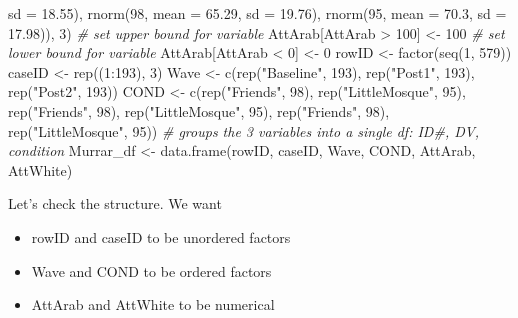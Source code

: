 \documentclass[
  11pt,
]{book}
\newenvironment{Shaded}{\begin{snugshade}}{\end{snugshade}}
\newcommand{\AttributeTok}[1]{\textcolor[rgb]{0.77,0.63,0.00}{#1}}
\newcommand{\CommentTok}[1]{\textcolor[rgb]{0.56,0.35,0.01}{\textit{#1}}}
\newcommand{\DecValTok}[1]{\textcolor[rgb]{0.00,0.00,0.81}{#1}}
\newcommand{\FloatTok}[1]{\textcolor[rgb]{0.00,0.00,0.81}{#1}}
\newcommand{\FunctionTok}[1]{\textcolor[rgb]{0.00,0.00,0.00}{#1}}
\newcommand{\NormalTok}[1]{#1}
\newcommand{\OtherTok}[1]{\textcolor[rgb]{0.56,0.35,0.01}{#1}}
\newcommand{\SpecialCharTok}[1]{\textcolor[rgb]{0.00,0.00,0.00}{#1}}
\newcommand{\StringTok}[1]{\textcolor[rgb]{0.31,0.60,0.02}{#1}}
\providecommand{\tightlist}{%
  \setlength{\itemsep}{0pt}\setlength{\parskip}{0pt}}
\begin{document}
\begin{Shaded}
\begin{Highlighting}[]
    \AttributeTok{sd =} \FloatTok{18.55}\NormalTok{), }\FunctionTok{rnorm}\NormalTok{(}\DecValTok{98}\NormalTok{, }\AttributeTok{mean =} \FloatTok{65.29}\NormalTok{, }\AttributeTok{sd =} \FloatTok{19.76}\NormalTok{), }\FunctionTok{rnorm}\NormalTok{(}\DecValTok{95}\NormalTok{, }\AttributeTok{mean =} \FloatTok{70.3}\NormalTok{,}
    \AttributeTok{sd =} \FloatTok{17.98}\NormalTok{)), }\DecValTok{3}\NormalTok{)}
\CommentTok{\# set upper bound for variable}
\NormalTok{AttArab[AttArab }\SpecialCharTok{\textgreater{}} \DecValTok{100}\NormalTok{] }\OtherTok{\textless{}{-}} \DecValTok{100}
\CommentTok{\# set lower bound for variable}
\NormalTok{AttArab[AttArab }\SpecialCharTok{\textless{}} \DecValTok{0}\NormalTok{] }\OtherTok{\textless{}{-}} \DecValTok{0}
\NormalTok{rowID }\OtherTok{\textless{}{-}} \FunctionTok{factor}\NormalTok{(}\FunctionTok{seq}\NormalTok{(}\DecValTok{1}\NormalTok{, }\DecValTok{579}\NormalTok{))}
\NormalTok{caseID }\OtherTok{\textless{}{-}} \FunctionTok{rep}\NormalTok{((}\DecValTok{1}\SpecialCharTok{:}\DecValTok{193}\NormalTok{), }\DecValTok{3}\NormalTok{)}
\NormalTok{Wave }\OtherTok{\textless{}{-}} \FunctionTok{c}\NormalTok{(}\FunctionTok{rep}\NormalTok{(}\StringTok{"Baseline"}\NormalTok{, }\DecValTok{193}\NormalTok{), }\FunctionTok{rep}\NormalTok{(}\StringTok{"Post1"}\NormalTok{, }\DecValTok{193}\NormalTok{), }\FunctionTok{rep}\NormalTok{(}\StringTok{"Post2"}\NormalTok{, }\DecValTok{193}\NormalTok{))}
\NormalTok{COND }\OtherTok{\textless{}{-}} \FunctionTok{c}\NormalTok{(}\FunctionTok{rep}\NormalTok{(}\StringTok{"Friends"}\NormalTok{, }\DecValTok{98}\NormalTok{), }\FunctionTok{rep}\NormalTok{(}\StringTok{"LittleMosque"}\NormalTok{, }\DecValTok{95}\NormalTok{), }\FunctionTok{rep}\NormalTok{(}\StringTok{"Friends"}\NormalTok{, }\DecValTok{98}\NormalTok{),}
    \FunctionTok{rep}\NormalTok{(}\StringTok{"LittleMosque"}\NormalTok{, }\DecValTok{95}\NormalTok{), }\FunctionTok{rep}\NormalTok{(}\StringTok{"Friends"}\NormalTok{, }\DecValTok{98}\NormalTok{), }\FunctionTok{rep}\NormalTok{(}\StringTok{"LittleMosque"}\NormalTok{, }\DecValTok{95}\NormalTok{))}
\CommentTok{\# groups the 3 variables into a single df: ID\#, DV, condition}
\NormalTok{Murrar\_df }\OtherTok{\textless{}{-}} \FunctionTok{data.frame}\NormalTok{(rowID, caseID, Wave, COND, AttArab, AttWhite)}
\end{Highlighting}
\end{Shaded}

Let's check the structure. We want

\begin{itemize}
\tightlist
\item
  rowID and caseID to be unordered factors
\item
  Wave and COND to be ordered factors
\item
  AttArab and AttWhite to be numerical
\end{itemize}
\end{document}
